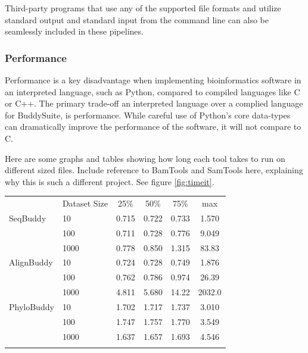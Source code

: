 \documentclass[nogrid]{MBE_article}%
\begin{document}
\smallskip
Third-party programs that use any of the supported file formats and utilize standard output and standard input from the command line can also be seamlessly included in these pipelines.

\subsubsection{Performance}
Performance is a key disadvantage when implementing bioinformatics software in an interpreted language, such as Python, compared to compiled languages like C or C++.
The primary trade-off an interpreted language over a complied language for BuddySuite, is performance. While careful use of Python's core data-types can dramatically improve the performance of the software, it will not compare to C.

Here are some graphs and tables showing how long each tool takes to run on different sized files. Include reference to BamTools and SamTools here, explaining why this is such a different project. See figure \ref{fig:timeit}.

\begin{table}[!t]
      {\tabcolsep=5pt\begin{tabular}{@{\extracolsep{\fill}}llcccc@{}}
      \toprule
	   				& Dataset Size	& 25\%		& 50\%		& 75\%		& max
      \\\colrule
      SeqBuddy		& 10				& 0.715	& 0.722	& 0.733	& 1.570 \\
      				& 100				& 0.711	& 0.728	& 0.776	& 9.049 \\
						& 1000			& 0.778	& 0.850	& 1.315	& 83.83
		\\\colrule
      AlignBuddy	& 10				& 0.724	& 0.728	& 0.749	& 1.876 \\
      				& 100				& 0.762	& 0.786	& 0.974	& 26.39 \\
						& 1000			& 4.811	& 5.680	& 14.22	& 2032.0
		\\\colrule
      PhyloBuddy	& 10				& 1.702	& 1.717	& 1.737	& 3.010 \\
      				& 100				& 1.747	& 1.757	& 1.770	& 3.549 \\
						& 1000			& 1.637	& 1.657	& 1.693	& 4.546
      \\\botrule
      \end{tabular}}
{}
\end{table}
\end{document}
